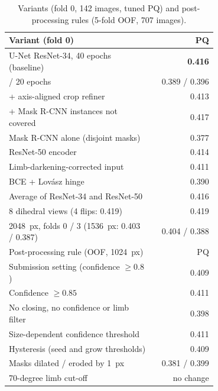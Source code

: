 \documentclass[sigconf]{acmart}
\begin{document}
\begin{table}[t]
\centering
\caption{Variants (fold 0, 142 images, tuned PQ) and post-processing rules (5-fold OOF, 707 images).}
\label{tab:abl}
\small
\begin{tabular}{@{}p{0.70\linewidth}r@{}}
\toprule
Variant (fold 0) & PQ \\
\midrule
U-Net ResNet-34, 40 epochs (baseline) & \textbf{0.416} \\
\quad 10 / 20 epochs & 0.389 / 0.396 \\
\quad + axis-aligned crop refiner & 0.413 \\
\quad + Mask R-CNN instances not covered & 0.417 \\
Mask R-CNN alone (disjoint masks) & 0.377 \\
ResNet-50 encoder & 0.414 \\
Limb-darkening-corrected input & 0.411 \\
BCE + Lov\'asz hinge & 0.390 \\
Average of ResNet-34 and ResNet-50 & 0.416 \\
8 dihedral views (4 flips: 0.419) & 0.419 \\
2048~px, folds 0 / 3 (1536~px: 0.403 / 0.387) & 0.404 / 0.388 \\
\midrule
Post-processing rule (OOF, 1024~px) & PQ \\
\midrule
Submission setting (confidence $\geq 0.8$) & 0.409 \\
Confidence $\geq 0.85$ & 0.411 \\
No closing, no confidence or limb filter & 0.398 \\
Size-dependent confidence threshold & 0.411 \\
Hysteresis (seed and grow thresholds) & 0.409 \\
Masks dilated / eroded by 1~px & 0.381 / 0.399 \\
70-degree limb cut-off & no change \\
\bottomrule
\end{tabular}
\end{table}
\end{document}
